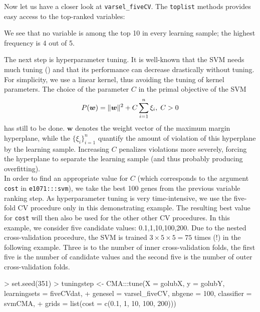 Now let us have a closer look at \verb+varsel_fiveCV+. The \texttt{toplist}
methods provides easy access to the top-ranked variables:

\begin{Schunk}
\end{Schunk}

We see that no variable is among the top 10 in every learning sample; the highest
frequency is 4 out of 5.

The next step is hyperparameter tuning. It is well-known that the SVM
needs much tuning (\citet{Sta2005a}) and that its performance can decrease 
drastically without tuning. For simplicity, we use a linear kernel, thus avoiding the tuning of 
kernel parameters. The choice of the parameter $C$ in the primal objective
of the SVM
\begin{equation*}
P(\bm{w}) = \lVert\bm{w}\rVert^2 + C \sum_{i=1}^n \xi_i, \; C > 0
\end{equation*}
has still to be done. $$ denotes the weight vector of the maximum margin hyperplane,
while the $\{ \xi_i \}_{i=1}^n$ quantify the amount of violation of this
hyperplane by the learning sample. Increasing $C$ 
penalizes violations more severely, forcing the hyperplane to separate the
learning sample (and thus probably producing overfitting).\\
In order to find an appropriate value for $C$ (which corresponds to the argument
\texttt{cost} in \texttt{e1071:::svm}), we take the best 100 genes from the
previous variable ranking step. As hyperparameter tuning is very time-intensive, 
we use the five-fold CV procedure only
in this demonstrating example. The resulting best 
 value for \texttt{cost} will then also be used for the other other CV procedures. 
In this example, we consider five candidate values: 0.1,1,10,100,200.
Due to the nested cross-validation procedure, the SVM is trained 
$3   = 75$ times (!) in the following example. Three is to
the number of inner cross-validation folds, the first five is the number of candidate values
and the second five is the number of outer cross-validation folds.

\begin{Schunk}
\begin{Sinput}
> set.seed(351)
> tuningstep <- CMA:::tune(X = golubX, y = golubY, learningsets = fiveCVdat, 
+     genesel = varsel_fiveCV, nbgene = 100, classifier = svmCMA, 
+     grids = list(cost = c(0.1, 1, 10, 100, 200)))
\end{Sinput}
\end{Schunk}



